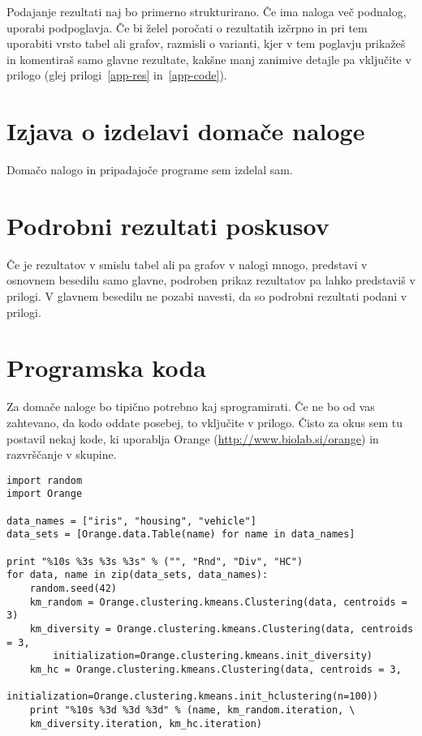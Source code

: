 \documentclass[a4paper,11pt]{article}
\begin{document}
Podajanje rezultati naj bo primerno strukturirano. Če ima naloga več
podnalog, uporabi podpoglavja. Če bi želel poročati o rezultatih
izčrpno in pri tem uporabiti vrsto tabel ali grafov, razmisli o
varianti, kjer v tem poglavju prikažeš in komentiraš samo glavne
rezultate, kakšne manj zanimive detajle pa vključite v prilogo (glej
prilogi~\ref{app-res} in~\ref{app-code}).

\section{Izjava o izdelavi domače naloge}
Domačo nalogo in pripadajoče programe sem izdelal sam.

\appendix
\appendixpage
\section{\label{app-res}Podrobni rezultati poskusov}

Če je rezultatov v smislu tabel ali pa grafov v nalogi mnogo,
predstavi v osnovnem besedilu samo glavne, podroben prikaz
rezultatov pa lahko predstaviš v prilogi. V glavnem besedilu ne
pozabi navesti, da so podrobni rezultati podani v prilogi.

\section{\label{app-code}Programska koda}

Za domače naloge bo tipično potrebno kaj sprogramirati. Če ne bo od
vas zahtevano, da kodo oddate posebej, to vključite v prilogo. Čisto
za okus sem tu postavil nekaj kode, ki uporablja Orange
(\url{http://www.biolab.si/orange}) in razvrščanje v skupine.


\begin{lstlisting}
import random
import Orange

data_names = ["iris", "housing", "vehicle"]
data_sets = [Orange.data.Table(name) for name in data_names]

print "%10s %3s %3s %3s" % ("", "Rnd", "Div", "HC")
for data, name in zip(data_sets, data_names):
    random.seed(42)
    km_random = Orange.clustering.kmeans.Clustering(data, centroids = 3)
    km_diversity = Orange.clustering.kmeans.Clustering(data, centroids = 3,
        initialization=Orange.clustering.kmeans.init_diversity)
    km_hc = Orange.clustering.kmeans.Clustering(data, centroids = 3,
        initialization=Orange.clustering.kmeans.init_hclustering(n=100))
    print "%10s %3d %3d %3d" % (name, km_random.iteration, \
    km_diversity.iteration, km_hc.iteration)
\end{lstlisting}
\end{document}
